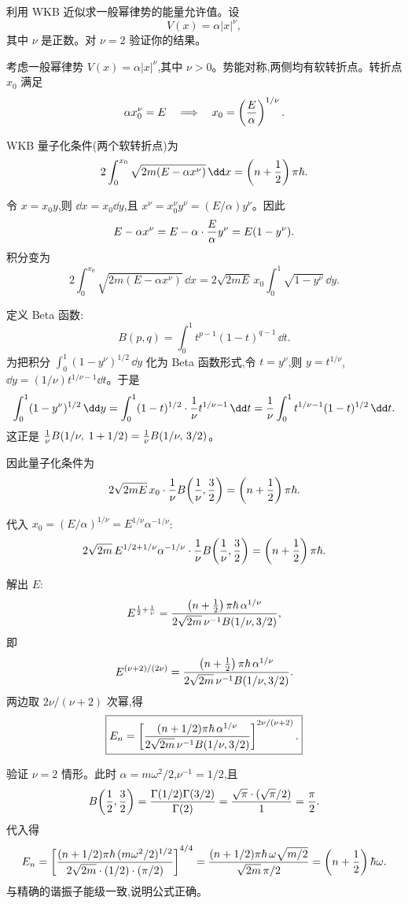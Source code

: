 \begin{question}
利用 WKB 近似求一般幂律势的能量允许值。设
\[
V(x)=\alpha |x|^\nu,
\]
其中 $\nu$ 是正数。对 $\nu=2$ 验证你的结果。
\end{question}
\begin{solution}
考虑一般幂律势 $V(x)=\alpha|x|^\nu$,其中 $\nu>0$。势能对称,两侧均有软转折点。转折点 $x_0$ 满足
\[
\alpha x_0^\nu=E\quad\Longrightarrow\quad x_0=\left({E\over\alpha}\right)^{1/\nu}.
\]

WKB 量子化条件(两个软转折点)为
\[
2\int_0^{x_0}\sqrt{2m(E-\alpha x^\nu)}\,\dd x
=\left(n+{1\over2}\right)\pi\hbar.
\]

令 $x=x_0 y$,则 $\dd x=x_0\dd y$,且 $x^\nu=x_0^\nu y^\nu=(E/\alpha)y^\nu$。因此
\[
E-\alpha x^\nu=E-\alpha\cdot{E\over\alpha}y^\nu=E(1-y^\nu).
\]
积分变为
\[
2\int_0^{x_0}\sqrt{2m(E-\alpha x^\nu)}\,\dd x
=2\sqrt{2mE}\,x_0\int_0^1\sqrt{1-y^\nu}\,\dd y.
\]

定义 Beta 函数:
\[
B(p,q)=\int_0^1 t^{p-1}(1-t)^{q-1}\,\dd t.
\]
为把积分 $\int_0^1(1-y^\nu)^{1/2}\,\dd y$ 化为 Beta 函数形式,令 $t=y^\nu$,则 $y=t^{1/\nu}$,$\dd y=(1/\nu)t^{1/\nu-1}\dd t$。于是
\[
\int_0^1(1-y^\nu)^{1/2}\,\dd y
=\int_0^1(1-t)^{1/2}\cdot{1\over\nu}t^{1/\nu-1}\,\dd t
={1\over\nu}\int_0^1 t^{1/\nu-1}(1-t)^{1/2}\,\dd t.
\]
这正是 ${1\over\nu}B(1/\nu,\;1+1/2)={1\over\nu}B(1/\nu,\,3/2)$。

因此量子化条件为
\[
2\sqrt{2mE}\,x_0\cdot{1\over\nu}B\!\left({1\over\nu},{3\over2}\right)
=\left(n+{1\over2}\right)\pi\hbar.
\]

代入 $x_0=(E/\alpha)^{1/\nu}=E^{1/\nu}\alpha^{-1/\nu}$:
\[
2\sqrt{2m}\,E^{1/2+1/\nu}\alpha^{-1/\nu}
\cdot{1\over\nu}B\!\left({1\over\nu},{3\over2}\right)
=\left(n+{1\over2}\right)\pi\hbar.
\]

解出 $E$:
\[
E^{{1\over2}+{1\over\nu}}
={\left(n+{1\over2}\right)\pi\hbar\,\alpha^{1/\nu}\over
2\sqrt{2m}\,\nu^{-1}B(1/\nu,3/2)},
\]
即
\[
E^{(\nu+2)/(2\nu)}
={\left(n+{1\over2}\right)\pi\hbar\,\alpha^{1/\nu}\over
2\sqrt{2m}\,\nu^{-1}B(1/\nu,3/2)}.
\]
两边取 $2\nu/(\nu+2)$ 次幂,得
\[
\boxed{E_n=\left[{(n+1/2)\pi\hbar\,\alpha^{1/\nu}\over
2\sqrt{2m}\,\nu^{-1}B(1/\nu,3/2)}\right]^{2\nu/(\nu+2)}.}
\]

验证 $\nu=2$ 情形。此时 $\alpha=m\omega^2/2$,$\nu^{-1}=1/2$,且
\[
B\!\left({1\over2},{3\over2}\right)
={\Gamma(1/2)\Gamma(3/2)\over\Gamma(2)}
={\sqrt\pi\cdot(\sqrt\pi/2)\over1}={\pi\over2}.
\]
代入得
\[
E_n=\left[{(n+1/2)\pi\hbar\,(m\omega^2/2)^{1/2}\over
2\sqrt{2m}\cdot(1/2)\cdot(\pi/2)}\right]^{4/4}
={(n+1/2)\pi\hbar\,\omega\sqrt{m/2}\over
\sqrt{2m}\,\pi/2}
=\left(n+{1\over2}\right)\hbar\omega.
\]
与精确的谐振子能级一致,说明公式正确。
\end{solution}

